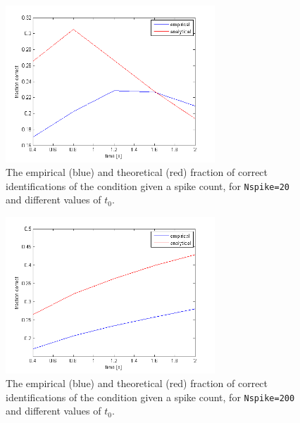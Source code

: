 \documentclass{scrartcl}
\begin{document}
\begin{figure}
\centering
\includegraphics[trim = {0.6cm 0 1.2cm 0.7cm}, width=0.7\textwidth, clip]{../pics/as3}
\caption{The empirical (blue) and theoretical (red) fraction of correct identifications of the condition given a spike count, for \texttt{Nspike=20} and different values of $t_0$.}
\label{as3}
\end{figure}

\begin{figure}
\centering
\includegraphics[trim = {0.6cm 0 1.2cm 0.7cm}, width=0.7\textwidth, clip]{../pics/as3_2}
\caption{The empirical (blue) and theoretical (red) fraction of correct identifications of the condition given a spike count, for \texttt{Nspike=200} and different values of $t_0$.}
\label{as3_2}
\end{figure}


\end{document}
